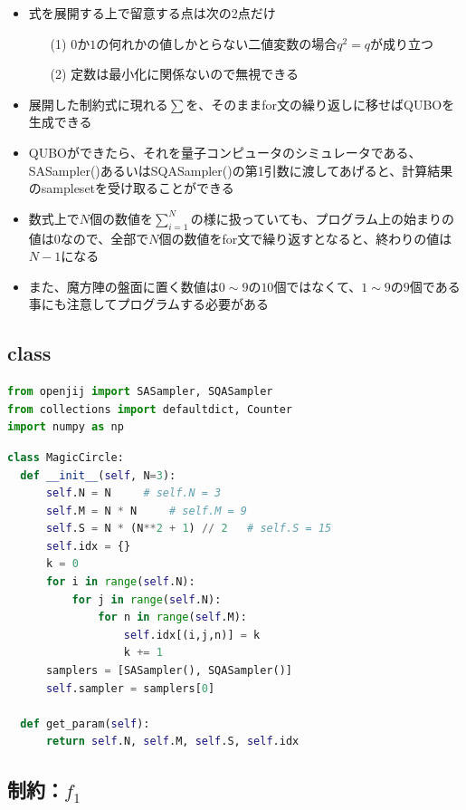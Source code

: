 \documentclass[uplatex,dvipdfmx,a4paper,11pt,oneside,openany]{jsbook}
\begin{document}
\begin{itemize}
\item 式を展開する上で留意する点は次の2点だけ
  \begin{itemize}
  \item[(1)] $0$か$1$の何れかの値しかとらない二値変数の場合$q^2=q$が成り立つ
  \item[(2)] 定数は最小化に関係ないので無視できる
  \end{itemize}
\item 展開した制約式に現れる$\sum$を、そのままfor文の繰り返しに移せばQUBOを生成できる
\item QUBOができたら、それを量子コンピュータのシミュレータである、SASampler()あるいはSQASampler()の第1引数に渡してあげると、計算結果のsamplesetを受け取ることができる
\item 数式上で$N$個の数値を$\sum_{i=1}^N$の様に扱っていても、プログラム上の始まりの値は$0$なので、全部で$N$個の数値をfor文で繰り返すとなると、終わりの値は$N-1$になる
\item また、魔方陣の盤面に置く数値は$0\sim 9$の$10$個ではなくて、$1\sim 9$の$9$個である事にも注意してプログラムする必要がある
\end{itemize}

\subsection{class}

\begin{lstlisting}[language=Python]
from openjij import SASampler, SQASampler
from collections import defaultdict, Counter
import numpy as np
\end{lstlisting}

\begin{lstlisting}[language=Python]
class MagicCircle:
  def __init__(self, N=3):
      self.N = N     # self.N = 3
      self.M = N * N     # self.M = 9
      self.S = N * (N**2 + 1) // 2   # self.S = 15
      self.idx = {}
      k = 0
      for i in range(self.N):
          for j in range(self.N):
              for n in range(self.M):
                  self.idx[(i,j,n)] = k
                  k += 1
      samplers = [SASampler(), SQASampler()]
      self.sampler = samplers[0]

  def get_param(self):
      return self.N, self.M, self.S, self.idx
\end{lstlisting}

\subsection{制約：$f_1$}
\end{document}
